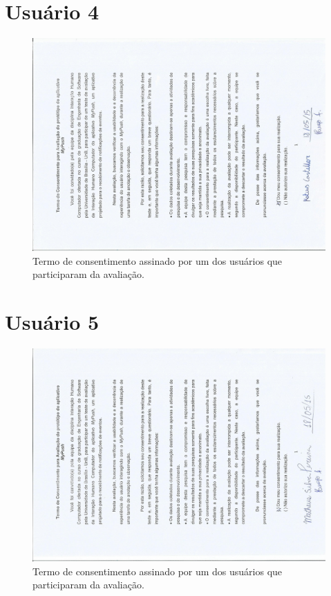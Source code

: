 \begin{anexosenv}
       \section*{Usuário 4}
    \begin{figure}[!htbp]
      \centering
      \includegraphics[scale=0.6, angle=-90]{editaveis/figuras/castellar}
      \caption{Termo de consentimento assinado por um dos usuários que participaram da avaliação.}
      \label{termo_consentimento_1}
    \end{figure}
    \pagebreak
    
       \section*{Usuário 5}
    \begin{figure}[!htbp]
      \centering
      \includegraphics[scale=0.6, angle=-90]{editaveis/figuras/silva}
      \caption{Termo de consentimento assinado por um dos usuários que participaram da avaliação.}
      \label{termo_consentimento_1}
    \end{figure}
    \pagebreak
    

\end{anexosenv}
